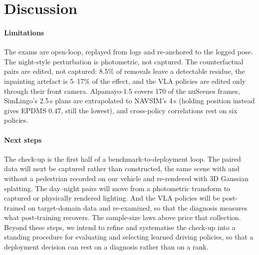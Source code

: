 \section{Discussion}
\label{sec:discussion}

\paragraph{Limitations}
The exams are open-loop, replayed from logs and re-anchored to the logged pose. The night-style
perturbation is photometric, not captured. The counterfactual pairs are edited, not captured: 8.5\% of
removals leave a detectable residue, the inpainting artefact is 5--17\% of the effect, and the VLA
policies are edited only through their front camera. Alpamayo-1.5 covers 170 of the nuScenes frames,
SimLingo's 2.5\,s plans are extrapolated to NAVSIM's 4\,s (holding position instead gives EPDMS 0.47, still the lowest), and cross-policy correlations rest on six
policies.

\paragraph{Next steps}
The check-up is the first half of a benchmark-to-deployment loop. The paired data will next be captured
rather than constructed, the same scene with and without a pedestrian recorded on our vehicle and
re-rendered with 3D Gaussian splatting. The day--night pairs will move from a photometric transform to
captured or physically rendered lighting. And the VLA policies will be post-trained on target-domain
data and re-examined, so that the diagnosis measures what post-training recovers. The sample-size laws
above price that collection. Beyond these steps, we intend to refine and systematise the check-up into a standing procedure for evaluating and selecting learned driving policies, so that a deployment decision can rest on a diagnosis rather than on a rank.

